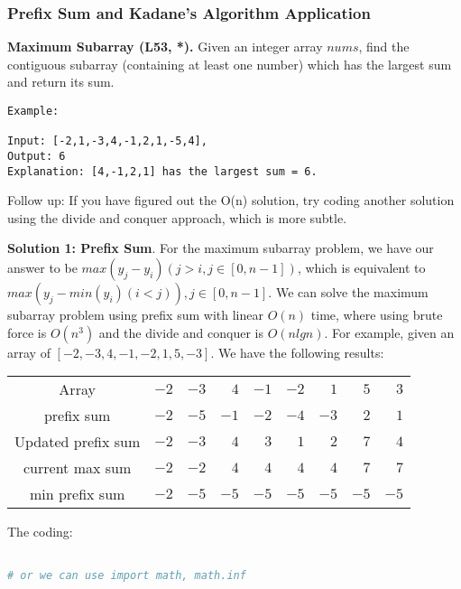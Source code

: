 \documentclass[../main.tex]{subfiles}
\begin{document}
\subsubsection{Prefix Sum and Kadane's Algorithm Application}
\label{prefix_sum_sloton}
\begin{examples}[resume]
\item \textbf{Maximum Subarray (L53, *).} Given an integer array $nums$, find the contiguous subarray (containing at least one number) which has the largest sum and return its sum.
\begin{lstlisting}[numbers=none]
Example:

Input: [-2,1,-3,4,-1,2,1,-5,4],
Output: 6
Explanation: [4,-1,2,1] has the largest sum = 6.
\end{lstlisting}
Follow up: If you have figured out the O(n) solution, try coding another solution using the divide and conquer approach, which is more subtle.

\textbf{Solution 1: Prefix Sum}. For the maximum subarray problem, we have our answer to be $max(y_j - y_i) (j>i, j\in[0,n-1])$, which is equivalent to $max(y_j - min(y_i)(i<j)), j\in[0,n-1]$. We can solve the maximum subarray problem using prefix sum with linear $O(n)$ time, where using brute force is $O(n^3)$ and the divide and conquer is $O(nlgn)$. For example, given an array of $[-2, -3, 4, -1, -2, 1, 5, -3]$. We have the following results:
\begin{table}[!ht]
\centering
\noindent{}
\label{tab: prefix_sum}
 \noindent \begin{tabular}{c rrrrrrrr}
  \hline\hline
Array  & $-2$& $-3$ & $4$& $-1$& $-2$& $1$& $5$& $3$\\
prefix sum   & $-2$& $-5$ & $-1$& $-2$& $-4$& $-3$& $2$& $1$ \\
Updated prefix sum &$-2$& $-3$& $4$& $3$& $1$& $2$ &$7$&$ 4$ \\
current max sum & $-2$& $-2$ & $4$& $4$& $4$& $4$& $7$& $7$\\ 
min prefix sum & $-2$& $-5$ & $-5$& $-5$& $-5$& $-5$& $-5$& $-5$\\ \hline
\end{tabular}
\end{table}
The coding:
\begin{lstlisting}[language = Python]

# or we can use import math, math.inf


\end{lstlisting}
\end{examples}
\end{document}
